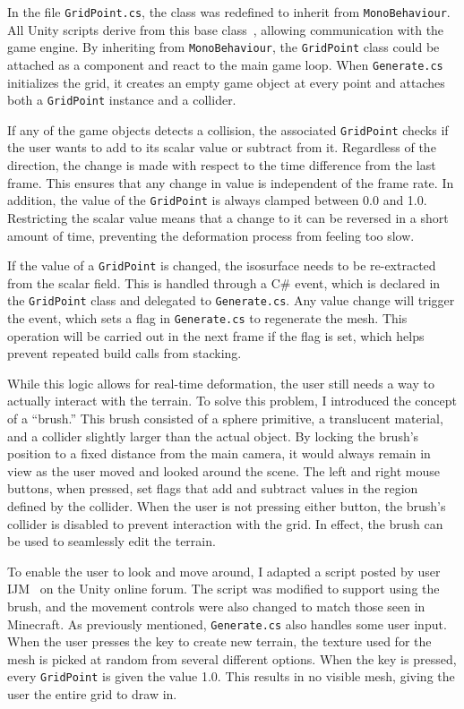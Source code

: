\documentclass[pageno]{jpaper}
\begin{document}
In the file \texttt{GridPoint.cs}, the class was redefined to inherit from \texttt{MonoBehaviour}. All Unity scripts derive from this base class~\cite{unitymono}, allowing communication with the game engine. By inheriting from \texttt{MonoBehaviour}, the \texttt{GridPoint} class could be attached as a component and react to the main game loop. When \texttt{Generate.cs} initializes the grid, it creates an empty game object at every point and attaches both a \texttt{GridPoint} instance and a collider. 

If any of the game objects detects a collision, the associated \texttt{GridPoint} checks if the user wants to add to its scalar value or subtract from it. Regardless of the direction, the change is made with respect to the time difference from the last frame. This ensures that any change in value is independent of the frame rate. In addition, the value of the \texttt{GridPoint} is always clamped between 0.0 and 1.0. Restricting the scalar value means that a change to it can be reversed in a short amount of time, preventing the deformation process from feeling too slow.

If the value of a \texttt{GridPoint} is changed, the isosurface needs to be re-extracted from the scalar field. This is handled through a C\# event, which is declared in the \texttt{GridPoint} class and delegated to \texttt{Generate.cs}. Any value change will trigger the event, which sets a flag in \texttt{Generate.cs} to regenerate the mesh. This operation will be carried out in the next frame if the flag is set, which helps prevent repeated build calls from stacking.

While this logic allows for real-time deformation, the user still needs a way to actually interact with the terrain. To solve this problem, I introduced the concept of a “brush.” This brush consisted of a sphere primitive, a translucent material, and a collider slightly larger than the actual object. By locking the brush's position to a fixed distance from the main camera, it would always remain in view as the user moved and looked around the scene. The left and right mouse buttons, when pressed, set flags that add and subtract values in the region defined by the collider. When the user is not pressing either button, the brush's collider is disabled to prevent interaction with the grid. In effect, the brush can be used to seamlessly edit the terrain.

To enable the user to look and move around, I adapted a script posted by user IJM~\cite{camera} on the Unity online forum. The script was modified to support using the brush, and the movement controls were also changed to match those seen in Minecraft. As previously mentioned, \texttt{Generate.cs} also handles some user input. When the user presses the  key to create new terrain, the texture used for the mesh is picked at random from several different options. When the  key is pressed, every \texttt{GridPoint} is given the value 1.0. This results in no visible mesh, giving the user the entire grid to draw in.
\end{document}
